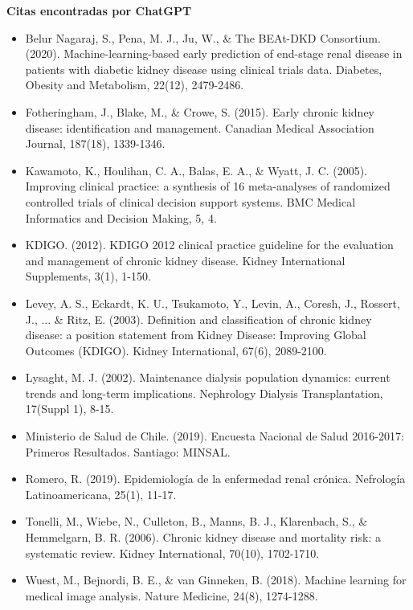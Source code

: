 \documentclass{article}
\begin{document}
\textbf{Citas encontradas por ChatGPT}
\begin{itemize}
    \item Belur Nagaraj, S., Pena, M. J., Ju, W., \& The BEAt-DKD Consortium. (2020). Machine-learning-based early prediction of end-stage renal disease in patients with diabetic kidney disease using clinical trials data. Diabetes, Obesity and Metabolism, 22(12), 2479-2486.
    \item Fotheringham, J., Blake, M., \& Crowe, S. (2015). Early chronic kidney disease: identification and management. Canadian Medical Association Journal, 187(18), 1339-1346.
    \item Kawamoto, K., Houlihan, C. A., Balas, E. A., \& Wyatt, J. C. (2005). Improving clinical practice: a synthesis of 16 meta-analyses of randomized controlled trials of clinical decision support systems. BMC Medical Informatics and Decision Making, 5, 4.
    \item KDIGO. (2012). KDIGO 2012 clinical practice guideline for the evaluation and management of chronic kidney disease. Kidney International Supplements, 3(1), 1-150.
    \item Levey, A. S., Eckardt, K. U., Tsukamoto, Y., Levin, A., Coresh, J., Rossert, J., ... \& Ritz, E. (2003). Definition and classification of chronic kidney disease: a position statement from Kidney Disease: Improving Global Outcomes (KDIGO). Kidney International, 67(6), 2089-2100.
    \item Lysaght, M. J. (2002). Maintenance dialysis population dynamics: current trends and long-term implications. Nephrology Dialysis Transplantation, 17(Suppl 1), 8-15.
    \item Ministerio de Salud de Chile. (2019). Encuesta Nacional de Salud 2016-2017: Primeros Resultados. Santiago: MINSAL.
    \item Romero, R. (2019). Epidemiología de la enfermedad renal crónica. Nefrología Latinoamericana, 25(1), 11-17.
    \item Tonelli, M., Wiebe, N., Culleton, B., Manns, B. J., Klarenbach, S., \& Hemmelgarn, B. R. (2006). Chronic kidney disease and mortality risk: a systematic review. Kidney International, 70(10), 1702-1710.
    \item Wuest, M., Bejnordi, B. E., \& van Ginneken, B. (2018). Machine learning for medical image analysis. Nature Medicine, 24(8), 1274-1288.
\end{itemize}
\newpage
\end{document}
